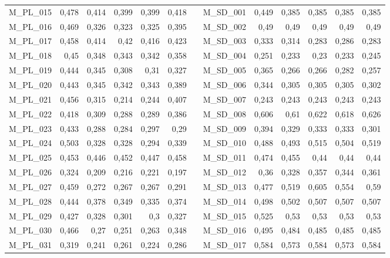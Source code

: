 \begin{table}[htbp]
\begin{adjustbox}{angle=90}
\begin{tabular}{lrrrrrrrrrrrr}
    M\_PL\_015 & 0,478 & 0,414 & 0,399 & 0,399 & 0,418 &      & M\_SD\_001 & 0,449 & 0,385 & 0,385 & 0,385 & 0,385 \\
    M\_PL\_016 & 0,469 & 0,326 & 0,323 & 0,325 & 0,395 &      & M\_SD\_002 & 0,49 & 0,49 & 0,49 & 0,49 & 0,49 \\
    M\_PL\_017 & 0,458 & 0,414 & 0,42 & 0,416 & 0,423 &      & M\_SD\_003 & 0,333 & 0,314 & 0,283 & 0,286 & 0,283 \\
    M\_PL\_018 & 0,45 & 0,348 & 0,343 & 0,342 & 0,358 &      & M\_SD\_004 & 0,251 & 0,233 & 0,23 & 0,233 & 0,245 \\
    M\_PL\_019 & 0,444 & 0,345 & 0,308 & 0,31 & 0,327 &      & M\_SD\_005 & 0,365 & 0,266 & 0,266 & 0,282 & 0,257 \\
    M\_PL\_020 & 0,443 & 0,345 & 0,342 & 0,343 & 0,389 &      & M\_SD\_006 & 0,344 & 0,305 & 0,305 & 0,305 & 0,302 \\
    M\_PL\_021 & 0,456 & 0,315 & 0,214 & 0,244 & 0,407 &      & M\_SD\_007 & 0,243 & 0,243 & 0,243 & 0,243 & 0,243 \\
    M\_PL\_022 & 0,418 & 0,309 & 0,288 & 0,289 & 0,386 &      & M\_SD\_008 & 0,606 & 0,61 & 0,622 & 0,618 & 0,626 \\
    M\_PL\_023 & 0,433 & 0,288 & 0,284 & 0,297 & 0,29 &      & M\_SD\_009 & 0,394 & 0,329 & 0,333 & 0,333 & 0,301 \\
    M\_PL\_024 & 0,503 & 0,328 & 0,328 & 0,294 & 0,339 &      & M\_SD\_010 & 0,488 & 0,493 & 0,515 & 0,504 & 0,519 \\
    M\_PL\_025 & 0,453 & 0,446 & 0,452 & 0,447 & 0,458 &      & M\_SD\_011 & 0,474 & 0,455 & 0,44 & 0,44 & 0,44 \\
    M\_PL\_026 & 0,324 & 0,209 & 0,216 & 0,221 & 0,197 &      & M\_SD\_012 & 0,36 & 0,328 & 0,357 & 0,344 & 0,361 \\
    M\_PL\_027 & 0,459 & 0,272 & 0,267 & 0,267 & 0,291 &      & M\_SD\_013 & 0,477 & 0,519 & 0,605 & 0,554 & 0,59 \\
    M\_PL\_028 & 0,444 & 0,378 & 0,349 & 0,335 & 0,374 &      & M\_SD\_014 & 0,498 & 0,502 & 0,507 & 0,507 & 0,507 \\
    M\_PL\_029 & 0,427 & 0,328 & 0,301 & 0,3  & 0,327 &      & M\_SD\_015 & 0,525 & 0,53 & 0,53 & 0,53 & 0,53 \\
    M\_PL\_030 & 0,466 & 0,27 & 0,251 & 0,263 & 0,348 &      & M\_SD\_016 & 0,495 & 0,484 & 0,485 & 0,485 & 0,485 \\
    M\_PL\_031 & 0,319 & 0,241 & 0,261 & 0,224 & 0,286 &      & M\_SD\_017 & 0,584 & 0,573 & 0,584 & 0,573 & 0,584 \\

\end{tabular}
\end{adjustbox}
\end{table}
